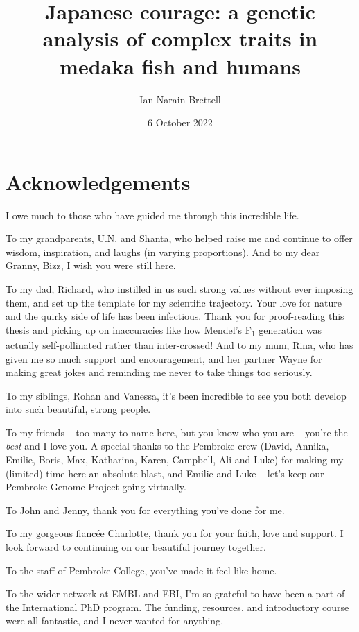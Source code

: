 \documentclass[
]{book}
\title{Japanese courage: a genetic analysis of complex traits in medaka fish and humans}
\author{Ian Narain Brettell}
\date{6 October 2022}
\begin{document}
\maketitle

{
\setcounter{tocdepth}{1}
\tableofcontents
}
\hypertarget{acknowledgements}{%
\chapter*{Acknowledgements}\label{acknowledgements}}

I owe much to those who have guided me through this incredible life.

To my grandparents, U.N. and Shanta, who helped raise me and continue to offer wisdom, inspiration, and laughs (in varying proportions). And to my dear Granny, Bizz, I wish you were still here.

To my dad, Richard, who instilled in us such strong values without ever imposing them, and set up the template for my scientific trajectory. Your love for nature and the quirky side of life has been infectious. Thank you for proof-reading this thesis and picking up on inaccuracies like how Mendel's F\textsubscript{1} generation was actually self-pollinated rather than inter-crossed! And to my mum, Rina, who has given me so much support and encouragement, and her partner Wayne for making great jokes and reminding me never to take things too seriously.

To my siblings, Rohan and Vanessa, it's been incredible to see you both develop into such beautiful, strong people.

To my friends -- too many to name here, but you know who you are -- you're the \emph{best} and I love you. A special thanks to the Pembroke crew (David, Annika, Emilie, Boris, Max, Katharina, Karen, Campbell, Ali and Luke) for making my (limited) time here an absolute blast, and Emilie and Luke -- let's keep our Pembroke Genome Project going virtually.

To John and Jenny, thank you for everything you've done for me.

To my gorgeous fiancée Charlotte, thank you for your faith, love and support. I look forward to continuing on our beautiful journey together.

To the staff of Pembroke College, you've made it feel like home.

To the wider network at EMBL and EBI, I'm so grateful to have been a part of the International PhD program. The funding, resources, and introductory course were all fantastic, and I never wanted for anything.
\end{document}
